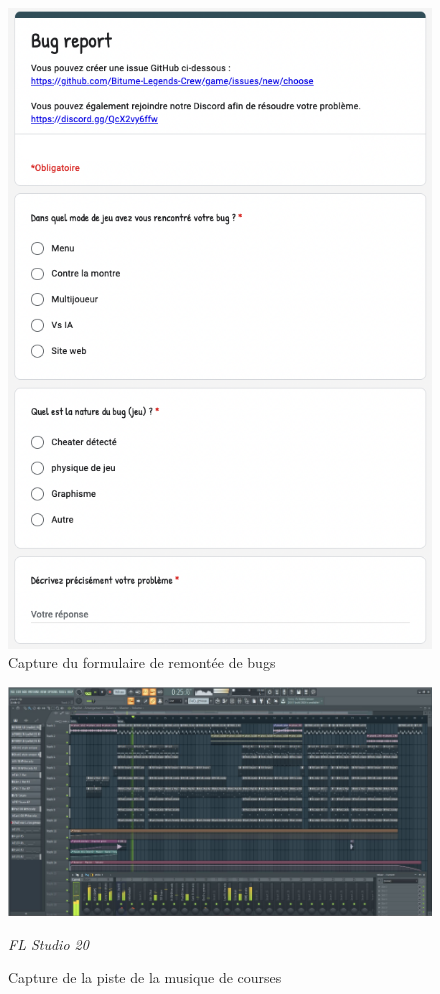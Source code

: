 \documentclass[12pt,a4paper]{article}
\begin{document}
\begin{figure}[t]
    \centering
    \includegraphics[width=12cm]{bugreport.png}
    \caption{Capture du formulaire de remontée de bugs}
    \label{fig:bug}
\end{figure}

\begin{figure}[t]
    \centering
    \includegraphics[width=15cm]{zik.png}
    \caption{Capture de la piste de la musique de courses}
    \label{fig:zik}
    \textsl{FL Studio 20}
\end{figure}
\end{document}

